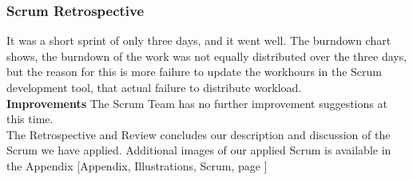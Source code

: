 \subsubsection{Scrum Retrospective}
It was a short sprint of only three days, and it went well. The burndown chart shows, the burndown of the work was not equally distributed over the three days, but the reason for this is more failure to update the workhours in the Scrum development tool, that actual failure to distribute workload. \\
\newline
\textbf{Improvements}
The Scrum Team has no further improvement suggestions at this time.\\
\newline
The Retrospective and Review concludes our description and discussion of the Scrum we have applied. Additional images of our applied Scrum is available in the Appendix [Appendix, Illustrations, Scrum, page \pageref{scrumillustrations}]
\newpage